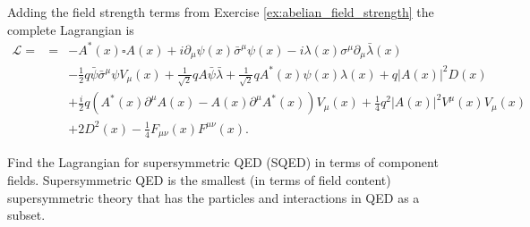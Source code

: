 \documentclass[notes.tex]{subfiles}
\begin{document}
\begin{Answer}
Adding the  field strength terms from Exercise \ref{ex:abelian_field_strength} the complete Lagrangian is
\begin{eqnarray}
\mathcal L = &=& -A^*(x)\square A(x)+i\partial_\mu\psi(x)\bar\sigma^\mu\psi(x) -i\lambda(x)\sigma^\mu \partial_\mu \bar\lambda(x) \nonumber\\
&&  -\frac{1}{2}q\bar\psi\bar\sigma^\mu\psi V_\mu(x) 
 + \frac{1}{\sqrt{2}}qA\bar\psi\bar\lambda +  \frac{1}{\sqrt{2}} qA^*(x)\psi(x) \lambda(x) +q|A(x)|^2D(x) \nonumber \\
&& + \frac{i}{2}q ( A^*(x)\partial^\mu A(x)- A(x)\partial^\mu A^*(x) )V_\mu(x) + \frac{1}{4} q^2 |A(x)|^2V^\mu(x) V_\mu(x)  \nonumber\\
&&+2D^2(x)-\frac{1}{4}F_{\mu\nu}(x)F^{\mu\nu}(x) .
\end{eqnarray}
\end{Answer}

\begin{Exercise}[]
\label{ex:SQED}
Find the Lagrangian for supersymmetric QED (SQED) in terms of component fields. Supersymmetric QED is the smallest  (in terms of field content) supersymmetric theory that has the particles and interactions in QED as a subset.
\end{Exercise}
\end{document}
